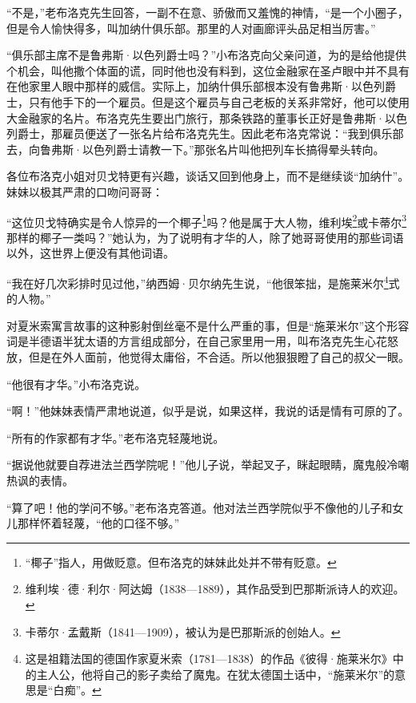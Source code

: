 \par “不是，”老布洛克先生回答，一副不在意、骄傲而又羞愧的神情，“是一个小圈子，但是令人愉快得多，叫加纳什俱乐部。那里的人对画廊评头品足相当厉害。”
\par “俱乐部主席不是鲁弗斯·以色列爵士吗？”小布洛克向父亲问道，为的是给他提供个机会，叫他撒个体面的谎，同时他也没有料到，这位金融家在圣卢眼中并不具有在他家里人眼中那样的威信。实际上，加纳什俱乐部根本没有鲁弗斯·以色列爵士，只有他手下的一个雇员。但是这个雇员与自己老板的关系非常好，他可以使用大金融家的名片。布洛克先生要出门旅行，那条铁路的董事长正好是鲁弗斯·以色列爵士，那雇员便送了一张名片给布洛克先生。因此老布洛克常说：“我到俱乐部去，向鲁弗斯·以色列爵士请教一下。”那张名片叫他把列车长搞得晕头转向。
\par 各位布洛克小姐对贝戈特更有兴趣，谈话又回到他身上，而不是继续谈“加纳什”。妹妹以极其严肃的口吻问哥哥：
\par “这位贝戈特确实是令人惊异的一个椰子\footnote{“椰子”指人，用做贬意。但布洛克的妹妹此处并不带有贬意。}吗？他是属于大人物，维利埃\footnote{维利埃·德·利尔·阿达姆（1838—1889），其作品受到巴那斯派诗人的欢迎。}或卡蒂尔\footnote{卡蒂尔·孟戴斯（1841—1909），被认为是巴那斯派的创始人。}那样的椰子一类吗？”她认为，为了说明有才华的人，除了她哥哥使用的那些词语以外，这世界上便没有其他词语。
\par “我在好几次彩排时见过他，”纳西姆·贝尔纳先生说，“他很笨拙，是施莱米尔\footnote{这是祖籍法国的德国作家夏米索（1781—1838）的作品《彼得·施莱米尔》中的主人公，他将自己的影子卖给了魔鬼。在犹太德国土话中，“施莱米尔”的意思是“白痴”。}式的人物。”
\par 对夏米索寓言故事的这种影射倒丝毫不是什么严重的事，但是“施莱米尔”这个形容词是半德语半犹太语的方言组成部分，在自己家里用一用，叫布洛克先生心花怒放，但是在外人面前，他觉得太庸俗，不合适。所以他狠狠瞪了自己的叔父一眼。
\par “他很有才华。”小布洛克说。
\par “啊！”他妹妹表情严肃地说道，似乎是说，如果这样，我说的话是情有可原的了。
\par “所有的作家都有才华。”老布洛克轻蔑地说。
\par “据说他就要自荐进法兰西学院呢！”他儿子说，举起叉子，眯起眼睛，魔鬼般冷嘲热讽的表情。
\par “算了吧！他的学问不够。”老布洛克答道。他对法兰西学院似乎不像他的儿子和女儿那样怀着轻蔑，“他的口径不够。”
